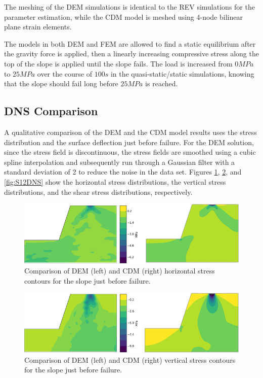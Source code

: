 The meshing of the DEM simulations is identical to the REV simulations for the parameter estimation, while the CDM model is meshed using 4-node bilinear plane strain elements.

The models in both DEM and FEM are allowed to find a static equilibrium after the gravity force is applied, then a linearly increasing compressive stress along the top of the slope is applied until the slope fails. The load is increased from $0MPa$ to $25 MPa$ over the course of $100s$ in the quasi-static/static simulations, knowing that the slope should fail long before $25MPa$ is reached.

\subsection{DNS Comparison}

A qualitative comparison of the DEM and the CDM model results uses the stress distribution and the surface deflection just before failure. For the DEM solution, since the stress field is discontinuous, the stress fields are smoothed using a cubic spline interpolation and subsequently run through a Gaussian filter with a standard deviation of 2 to reduce the noise in the data set. Figures \ref{fig:S11DNS}, \ref{fig:S22DNS}, and \ref{fig:S12DNS} show the horizontal stress distributions, the vertical stress distributions, and the shear stress distributions, respectively.

\begin{figure}[!htb]
\begin{center}
\includegraphics[width=\textwidth]{figures/Chapter5/HorizontalStressContours}
\caption{{\label{fig:S11DNS} Comparison of DEM (left) and CDM (right) horizontal stress contours for the slope just before failure.%
}}
\end{center}
\end{figure}

\begin{figure}[!htb]
\begin{center}
\includegraphics[width=\textwidth]{figures/Chapter5/VerticalStressContours}
\caption{{\label{fig:S22DNS} Comparison of DEM (left) and CDM (right) vertical stress contours for the slope just before failure.%
}}
\end{center}
\end{figure}

